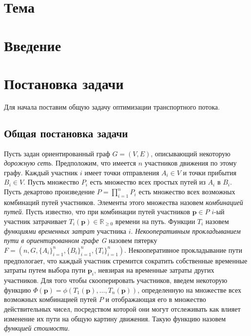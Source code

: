 \documentclass[12pt, a4paper]{article}
\begin{document}
\newpage
\pagestyle{plain}
\tableofcontents{}
\newpage	
	
 \section*{Тема}


\section*{Введение}


\newpage
\section{Постановка задачи}

Для начала поставим общую задачу оптимизации транспортного потока.


\subsection{Общая постановка задачи}

Пусть задан ориентированный граф $G = (V, E)$, описывающий некоторую \textit{дорожную сеть}. Предположим, что имеется $n$ участников движения по этому графу. Каждый участник $i$ имеет точки отправления $A_i \in V$ и точки прибытия $B_i \in V$. Пусть множество $P_i$ есть множество всех простых путей из $A_i$ в $B_i$. Пусть декартово произведение ${P = \prod \limits_{i = 1} ^ n P_i}$ есть множество всех возможных комбинаций путей участников. Элементы этого множества назовем \textit{комбинацией путей}. Пусть известно, что при комбинации путей участников ${\textbf{p} \in P}$ $i$-ый участник затрачивает $T_i(\textbf{p}) \in \mathbb{R}_{\ge 0}$ времени на путь. 
Функции $T_i$ назовем \textit{функциями временных затрат} участника $i$.
\textit{Некооперативным прокладыванием пути в ориентированном графе G} назовем пятерку $F = (n, G, \{A_i\}_{i = 1}^{n}, \{B_i\}_{i = 1}^{n}, \{T_i\}_{i = 1}^{n})$. Некооперативное прокладывание пути предпологает, что каждый участник стремится сократить собственные временные затраты путем выбора пути $\textbf{p}_i$, невзирая на временные затраты других участников. 
Для того чтобы скооперировать участников, введем некоторую функцию $\Phi (\textbf{p}) = \phi (T_1 (\textbf{p}), \ldots, T_n(\textbf{p}))$, определенную на множестве всех возможных комбинацией путей $P$ и отображающая его в множество действительных чисел, посредством которой они могут отслеживать как влияет изменение их пути на общую картину движения. Такую функцию назовем \textit{функцией стоимости}.
\end{document}
